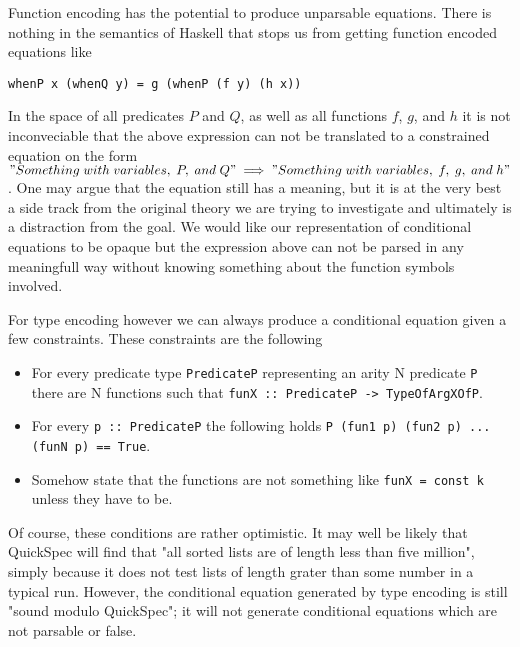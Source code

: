 Function encoding has the potential to produce unparsable equations.
There is nothing in the semantics of Haskell that stops us from getting function
encoded equations like
\begin{verbatim}whenP x (whenQ y) = g (whenP (f y) (h x))\end{verbatim}
In the space of all predicates $P$ and $Q$, as well as all functions $f$, $g$, and $h$ it
is not inconveciable that the above expression can not be translated to a constrained
equation on the form\\$"Something\;with\;variables,\;P,\;and\;Q"\implies "Something\;with\;variables,\;f,\;g,\;and\;h"$.
One may argue that the equation still has a meaning, but it is at the very best a side track
from the original theory we are trying to investigate and ultimately is a distraction from the goal.
We would like our representation of conditional equations to be opaque but the expression above
can not be parsed in any meaningfull way without knowing something about the function symbols involved.

For type encoding however we can always produce a conditional equation given a few constraints.
These constraints are the following
\begin{itemize}
    \item For every predicate type \texttt{PredicateP} representing an arity N predicate \texttt{P}
        there are N functions such that \texttt{funX :: PredicateP -> TypeOfArgXOfP}.
    \item For every \texttt{p :: PredicateP} the following holds \texttt{P (fun1 p) (fun2 p) ... (funN p) == True}.
    \item Somehow state that the functions are not something like \texttt{funX = const k} unless they have to be.
\end{itemize}
Of course, these conditions are rather optimistic. It may well be likely that QuickSpec will find that "all sorted lists
are of length less than five million", simply because it does not test lists of length grater than some number in a typical
run. However, the conditional equation generated by type encoding is still "sound modulo QuickSpec"; it will not generate
conditional equations which are not parsable or false. %
